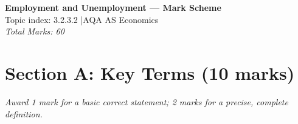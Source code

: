 \documentclass[12pt,a4paper]{article}
\begin{document}
\begin{center}
    \Large\textbf{Employment and Unemployment --- Mark Scheme}\\[5pt]
    \normalsize Topic index: 3.2.3.2 \quad|\quad AQA AS Economics\\[3pt]
    \textit{Total Marks: 60}
\end{center}

\vspace{1em}

\section*{Section A: Key Terms (10 marks)}

\textit{Award 1 mark for a basic correct statement; 2 marks for a precise, complete definition.}

\vspace{0.5em}
\end{document}
